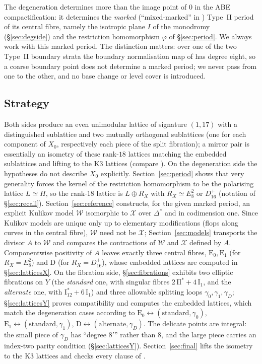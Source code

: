 \documentclass[12pt]{article}
\newcommand{\calX}{\mathcal X}
\newcommand{\calW}{\mathcal W}
\newcommand{\II}{\mathrm{II}}
\newcommand{\I}{\mathrm{I}}
\theoremstyle{definition}
\theoremstyle{remark}
\begin{document}
The degeneration determines more than the image point of \(0\) in the
ABE compactification: it determines the \emph{marked} (``mixed-marked''
in \cite{AE}) Type~II period of its central fibre, namely the isotropic
plane \(I\) of the monodromy (\S\ref{sec:degside}) and the restriction
homomorphism \(\varphi\) of \S\ref{sec:period}. We always work with
this marked period. The distinction matters: over one of the two
Type~II boundary strata the boundary normalisation map of
\cite[Theorem~7.58]{ABE} has degree eight, so a coarse boundary point
does not determine a marked period; we never pass from one to the
other, and no base change or level cover is introduced.

\subsection{Strategy}\label{sec:strategy}

Both sides produce an even unimodular lattice of signature \((1,17)\)
with a distinguished sublattice and two mutually orthogonal sublattices
(one for each component of \(X_0\), respectively each piece of the
split fibration); a mirror pair is essentially an isometry of these
rank-\(18\) lattices matching the embedded sublattices and lifting to
the K3 lattices (compare \cite[Proposition~5.3]{GT}). On the
degeneration side the hypotheses do not describe \(X_0\) explicitly.
Section~\ref{sec:period} shows that very generality forces
the kernel of the restriction homomorphism to be the polarising
lattice \(L\simeq H\), so the rank-\(18\) lattice is \(L\oplus R_X\)
with \(R_X\simeq E_8^2\) or \(D_{16}^+\) (notation of
\S\ref{sec:recall}). Section~\ref{sec:reference} constructs, for the
given marked period, an explicit Kulikov model \(\calW\) isomorphic to
\(\calX\) over \(\Delta^*\) and in codimension one. Since Kulikov
models are unique only up to elementary modifications (flops along
curves in the central fibre), \(\calW\) need not be \(\calX\);
Section~\ref{sec:models}
transports the divisor \(A\) to \(\calW\) and compares the contractions
of \(\calW\) and \(\calX\) defined by \(A\). Componentwise positivity
of \(A\) leaves exactly three central fibres, \(\mathrm E_0,\mathrm E_1\)
(for \(R_X=E_8^2\)) and \(\mathrm D\) (for \(R_X=D_{16}^+\)), whose
embedded lattices are computed in \S\ref{sec:latticesX}. On the
fibration side, \S\ref{sec:fibrations} exhibits two elliptic
fibrations on \(Y\) (the \emph{standard} one, with singular fibres
\(2\,\II^*+4\,\I_1\), and the \emph{alternate} one, with
\(\I_{12}^*+6\,\I_1\)) and three allowable splitting loops
\(\gamma_0,\gamma_1,\gamma_D\); \S\ref{sec:latticesY} proves
compatibility and computes the embedded lattices, which match the
degeneration cases according to
\(\mathrm E_0\leftrightarrow(\text{standard},\gamma_0)\),
\(\mathrm E_1\leftrightarrow(\text{standard},\gamma_1)\),
\(\mathrm D\leftrightarrow(\text{alternate},\gamma_D)\).
The delicate points are integral: the small piece of \(\gamma_D\) has
``degree \(8'\)'' rather than \(8\), and the large piece carries an
index-two parity condition (\S\ref{sec:latticesY}).
Section~\ref{sec:final} lifts the isometry to the K3 lattices and
checks every clause of \cite[Definition~5.1]{GT}.
\end{document}
